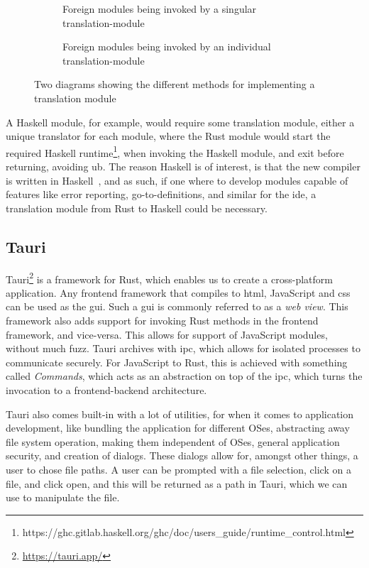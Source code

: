 \begin{figure}[H]
  \begin{subfigure}[h]{0.49\linewidth}
    
    \caption{Foreign modules being invoked by a singular translation-module}
    \label{fig:fm1}
  \end{subfigure}
  \hfill
  \begin{subfigure}[h]{0.49\linewidth}
    
    \caption{Foreign modules being invoked by an individual translation-module}
    \label{fig:fm2}
  \end{subfigure}
  \caption{
    Two diagrams showing the different methods for implementing a translation
    module
  }
  \label{fig:fm}
\end{figure}

A Haskell module, for example, would require some translation module, either a
unique translator for each module, where the Rust module would start the
required Haskell runtime\footnote{https://ghc.gitlab.haskell.org/ghc/doc/users\_guide/runtime\_control.html},
when invoking the Haskell module, and exit before returning, avoiding \gls*{ub}.
The reason Haskell is of interest, is that the new compiler is written in
Haskell~\cite{wiig}, and as such, if one where to develop modules capable of
features like error reporting, go-to-definitions, and similar for the
\gls*{ide}, a translation module from Rust to Haskell could be necessary.


\subsection{Tauri}

Tauri\footnote{\url{https://tauri.app/}} is a framework for Rust, which enables
us to create a cross-platform application. Any frontend framework that compiles
to \gls*{html}, JavaScript and \gls*{css} can be used as the \gls*{gui}. Such a
\gls*{gui} is commonly referred to as a \textit{web view}. This framework also
adds support for invoking Rust methods in the frontend framework, and
vice-versa. This allows for support of JavaScript modules, without much fuzz.
Tauri archives with \gls*{ipc}, which allows for isolated processes to
communicate securely. For JavaScript to Rust, this is achieved with something
called \textit{Commands}, which acts as an abstraction on top of the \gls*{ipc},
which turns the invocation to a frontend-backend architecture.

Tauri also comes built-in with a lot of utilities, for when it comes to
application development, like bundling the application for different OSes,
abstracting away file system operation, making them independent of OSes, general
application security, and creation of dialogs. These dialogs allow for, amongst
other things, a user to chose file paths. A user can be prompted with a file
selection, click on a file, and click open, and this will be returned as a path
in Tauri, which we can use to manipulate the file.


